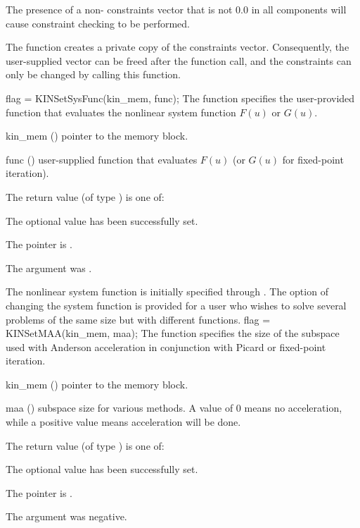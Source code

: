 {
  The presence of a non- constraints vector that is not $0.0$ in
  all components will cause constraint checking to be performed.

  The function creates a private copy of the constraints vector. Consequently,
  the user-supplied vector can be freed after the function call, and
  the constraints can only be changed by calling this function.
}
{
flag = KINSetSysFunc(kin\_mem, func);
}
{
  The function  specifies the user-provided function
  that evaluates the nonlinear system function $F(u)$ or $G(u)$.
}
{
  \begin{args}
  \item[kin\_mem] ()
    pointer to the {\kinsol} memory block.
  \item[func] ()
    user-supplied function that evaluates $F(u)$ (or $G(u)$ for fixed-point 
    iteration).
  \end{args}
}
{
  The return value  (of type ) is one of:
  \begin{args}
  \item[\Id{KIN\_SUCCESS}] 
    The optional value has been successfully set.
  \item[\Id{KIN\_MEM\_NULL}]
    The  pointer is .
  \item[\Id{KIN\_ILL\_INPUT}]
    The argument  was .
  \end{args}
}
{
  The nonlinear system function is initially specified through .
  The option of changing the system function is provided for a user who wishes 
  to solve several problems of the same size but with different functions.
}
{
flag = KINSetMAA(kin\_mem, maa);
}
{
  The function  specifies the size of the subspace used with
  Anderson acceleration in conjunction with Picard or fixed-point iteration.
}
{
  \begin{args}
  \item[kin\_mem] ()
    pointer to the {\kinsol} memory block.
  \item[maa] ()
    subspace size for various methods.  A value of 0 means no acceleration,
    while a positive value means acceleration will be done.
  \end{args}
}
{
  The return value  (of type ) is one of:
  \begin{args}
  \item[\Id{KIN\_SUCCESS}] 
    The optional value has been successfully set.
  \item[\Id{KIN\_MEM\_NULL}]
    The  pointer is .
  \item[\Id{KIN\_ILL\_INPUT}]
    The argument  was negative.
  \end{args}
}

